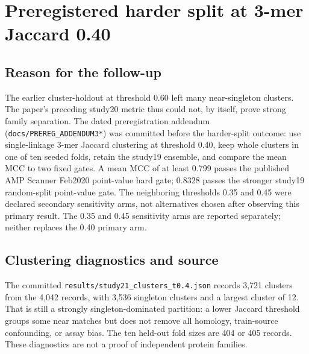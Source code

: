 \clearpage
\section*{Preregistered harder split at 3-mer Jaccard 0.40}
\label{sec:harder-split}
\subsection*{Reason for the follow-up}
The earlier cluster-holdout at threshold 0.60 left many near-singleton clusters. The paper's preceding study20 metric thus could not, by itself, prove strong family separation. The dated preregistration addendum (\texttt{docs/PREREG\_ADDENDUM3*}) was committed before the harder-split outcome: use single-linkage 3-mer Jaccard clustering at threshold 0.40, keep whole clusters in one of ten seeded folds, retain the study19 ensemble, and compare the mean MCC to two fixed gates. A mean MCC of at least 0.799 passes the published AMP Scanner Feb2020 point-value hard gate; 0.8328 passes the stronger study19 random-split point-value gate. The neighboring thresholds 0.35 and 0.45 were declared secondary sensitivity arms, not alternatives chosen after observing this primary result. The 0.35 and 0.45 sensitivity arms are reported separately; neither replaces the 0.40 primary arm.
\subsection*{Clustering diagnostics and source}
The committed \texttt{results/study21\_clusters\_t0.4.json} records 3,721 clusters from the 4,042 records, with 3,536 singleton clusters and a largest cluster of 12. That is still a strongly singleton-dominated partition: a lower Jaccard threshold groups some near matches but does not remove all homology, train-source confounding, or assay bias. The ten held-out fold sizes are 404 or 405 records. These diagnostics are not a proof of independent protein families.
